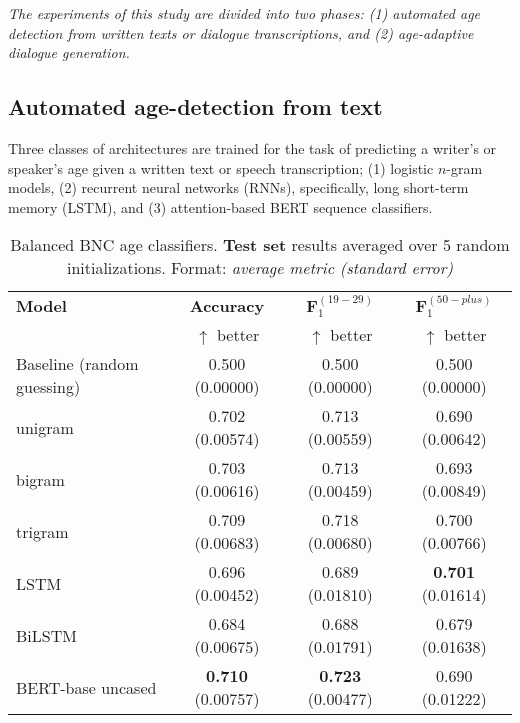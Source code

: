 \textit{The experiments of this study are divided into two phases: (1) automated age detection from written texts or dialogue transcriptions, and (2) age-adaptive dialogue generation.}

\subsection{Automated age-detection from text}

Three classes of architectures are trained for the task of predicting a writer's or speaker's age given a written text or speech transcription; (1) logistic $n$-gram models, (2) recurrent neural networks (RNNs), specifically, long short-term memory (LSTM), and (3) attention-based BERT sequence classifiers.

\begin{table}[H]
    \centering
    \begin{tabular}{l c c c}
    \hline
    \textbf{Model} & \textbf{Accuracy} & $\boldsymbol{F}_1^{(19-29)}$  & $\boldsymbol{F}_1^{(50-plus)}$ \\
     & $\uparrow$ better & $\uparrow$ better & $\uparrow$ better \\
    \hline
    Baseline (random guessing) & 0.500 (0.00000) & 0.500 (0.00000) & 0.500 (0.00000)\\
    unigram & 0.702 (0.00574) & 0.713 (0.00559)  & 0.690 (0.00642)\\
    bigram & 0.703 (0.00616) & 0.713 (0.00459) & 0.693 (0.00849)\\
    trigram &  0.709 (0.00683) & 0.718 (0.00680) & 0.700 (0.00766)\\
    LSTM & 0.696 (0.00452) & 0.689 (0.01810) & \textbf{0.701} (0.01614)\\
    BiLSTM & 0.684 (0.00675) & 0.688 (0.01791) & 0.679 (0.01638) \\
    BERT-base uncased & \textbf{0.710} (0.00757) & \textbf{0.723} (0.00477) & 0.690 (0.01222)\\
    \hline
    \end{tabular}
    \caption{Balanced BNC age classifiers. \textbf{Test set} results averaged over 5 random initializations. Format: \textit{average metric (standard error)}}
    \label{tab:bnc_classification}
\end{table}

